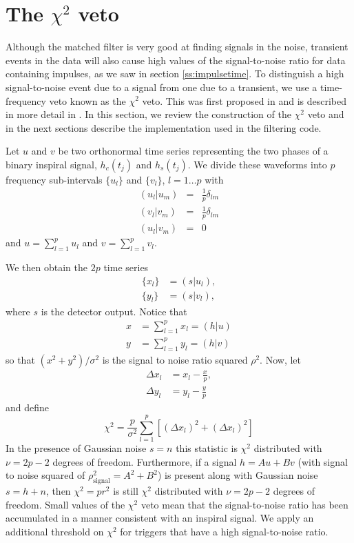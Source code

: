 \section{The $\chi^2$ veto}
\label{s:chisqcts}

Although the matched filter is very good at finding signals in the noise,
transient events in the data will also cause high values of the
signal-to-noise ratio for data containing impulses, as we saw in section
\ref{ss:impulsetime}. To distinguish a high signal-to-noise event due to a
signal from one due to a transient, we use a time-frequency veto known as the
$\chi^2$ veto. This was first proposed in \cite{grasp} and is described in
more detail in \cite{Allen:2004}.  In this section, we review the construction
of the $\chi^2$ veto and in the next sections describe the implementation used
in the filtering code.

Let $u$ and $v$ be two orthonormal time series representing the two phases of a
binary inspiral signal, $h_c(t_j)$ and $h_s(t_j)$.  We divide these waveforms
into $p$ frequency sub-intervals $\{u_l\}$ and $\{v_l\}$, $l=1\ldots p$ with
\begin{eqnarray}
  (u_l|u_m) &=& \frac{1}{p}\delta_{lm} \\
  (v_l|v_m) &=& \frac{1}{p}\delta_{lm} \\
  (u_l|v_m) &=& 0
\end{eqnarray}
and $u=\sum_{l=1}^p u_l$ and $v=\sum_{l=1}^p v_l$.

We then obtain the $2p$ time series
\begin{align}
\{x_l\} & =(s|u_l),\\ 
\{y_l\} & =(s|v_l),
\end{align}
where $s$ is the detector output. Notice that 
\begin{align}
x &= \sum_{l=1}^p x_l=(h|u) \\
y &=\sum_{l=1}^p y_l=(h|v)
\end{align}
so that $(x^2+y^2)/ \sigma^2$ is the signal to noise ratio squared $\rho^2$.
Now, let 
\begin{align}
\Delta x_l &= x_l - \frac{x}{p}, \\
\Delta y_l &= y_l - \frac{y}{p}
\end{align}
and define
\begin{equation}
\chi^2 = \frac{p}{\sigma^2} \sum_{l=1}^p \left[ (\Delta x_l)^2 + (\Delta x_l)^2 \right]
\end{equation}
In the presence of Gaussian noise $s=n$ this statistic is $\chi^2$ distributed
with $\nu=2p-2$ degrees of freedom.  Furthermore, if a signal $h=Au+Bv$ (with signal
to noise squared of $\rho^2_{\mathrm{signal}}=A^2+B^2$) is present along with
Gaussian noise $s=h+n$, then $\chi^2=pr^2$ is still $\chi^2$ distributed
with $\nu=2p-2$ degrees of freedom. Small values of the $\chi^2$ veto mean
that the signal-to-noise ratio has been accumulated in a manner consistent
with an inspiral signal. We apply an additional threshold on $\chi^2$
for triggers that have a high signal-to-noise ratio.

